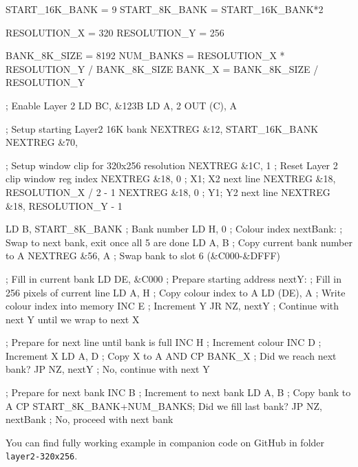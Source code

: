 \begin{tcblisting}{}
START_16K_BANK  = 9
START_8K_BANK   = START_16K_BANK*2

RESOLUTION_X    = 320
RESOLUTION_Y    = 256

BANK_8K_SIZE    = 8192
NUM_BANKS       = RESOLUTION_X * RESOLUTION_Y / BANK_8K_SIZE
BANK_X          = BANK_8K_SIZE / RESOLUTION_Y

    ; Enable Layer 2
    LD BC, &123B
    LD A, 2
    OUT (C), A

    ; Setup starting Layer2 16K bank
    NEXTREG &12, START_16K_BANK
    NEXTREG &70, %

    ; Setup window clip for 320x256 resolution
    NEXTREG &1C, 1            ; Reset Layer 2 clip window reg index
    NEXTREG &18, 0            ; X1; X2 next line
    NEXTREG &18, RESOLUTION_X / 2 - 1
    NEXTREG &18, 0            ; Y1; Y2 next line
    NEXTREG &18, RESOLUTION_Y - 1

    LD B, START_8K_BANK       ; Bank number
    LD H, 0                   ; Colour index
nextBank:
    ; Swap to next bank, exit once all 5 are done
    LD A, B                   ; Copy current bank number to A
    NEXTREG &56, A            ; Swap bank to slot 6 (&C000-&DFFF)

    ; Fill in current bank
    LD DE, &C000              ; Prepare starting address
nextY:
    ; Fill in 256 pixels of current line
    LD A, H                   ; Copy colour index to A
    LD (DE), A                ; Write colour index into memory
    INC E                     ; Increment Y
    JR NZ, nextY              ; Continue with next Y until we wrap to next X

    ; Prepare for next line until bank is full
    INC H                     ; Increment colour
    INC D                     ; Increment X
    LD A, D                   ; Copy X to A
    AND %
    CP BANK_X                 ; Did we reach next bank?
    JP NZ, nextY              ; No, continue with next Y

    ; Prepare for next bank
    INC B                     ; Increment to next bank
    LD A, B                   ; Copy bank to A
    CP START_8K_BANK+NUM_BANKS; Did we fill last bank?
    JP NZ, nextBank           ; No, proceed with next bank
\end{tcblisting}

You can find fully working example in companion code on GitHub in folder {\tt layer2-320x256}.


